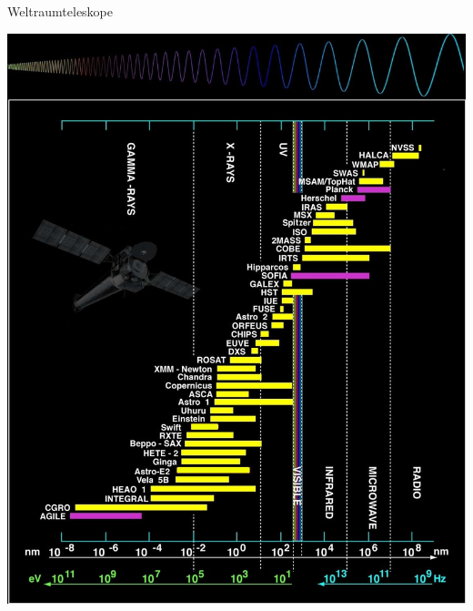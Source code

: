 \documentclass[14pt]{beamer}
\begin{document}
\begin{frame}{Weltraumteleskope}
	\begin{center}
	\includegraphics[height=0.8\textheight]{Space_telescopes.png}		
	\end{center}
\end{frame}
\end{document}
